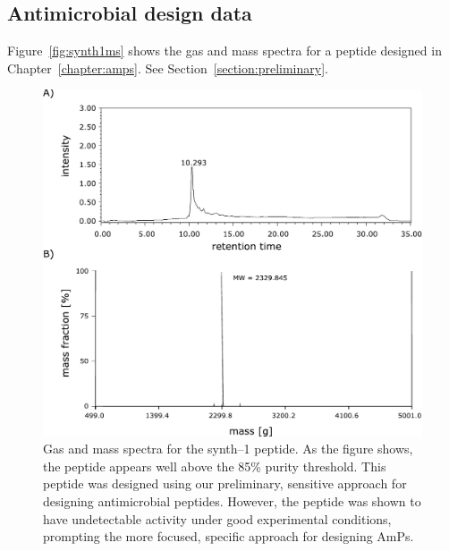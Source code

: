 \begin{singlespace}
\small

\normalsize
\end{singlespace}

\subsection{Antimicrobial design data}

    Figure~\vref{fig:synth1ms} shows the gas and mass spectra for a
    peptide designed in Chapter~\ref{chapter:amps}.  See
    Section~\vref{section:preliminary}.

        \begin{figure}[htbp]
        \centering
        \includegraphics[width=\textwidth]{Body/Images-appa/synth1-spectra.pdf}
        \caption[Gas and mass spectra for the synth--1 peptide]{
        Gas and mass spectra for the synth--1 peptide.  As the
        figure shows, the peptide appears well above  the 85\% purity
        threshold.  This peptide was designed using our preliminary,
        sensitive approach for designing antimicrobial peptides.
        However, the peptide was shown to have undetectable activity
        under good experimental conditions, prompting the more
        focused, specific approach for designing AmPs.
        }
        \label{fig:synth1ms}
        \end{figure}
